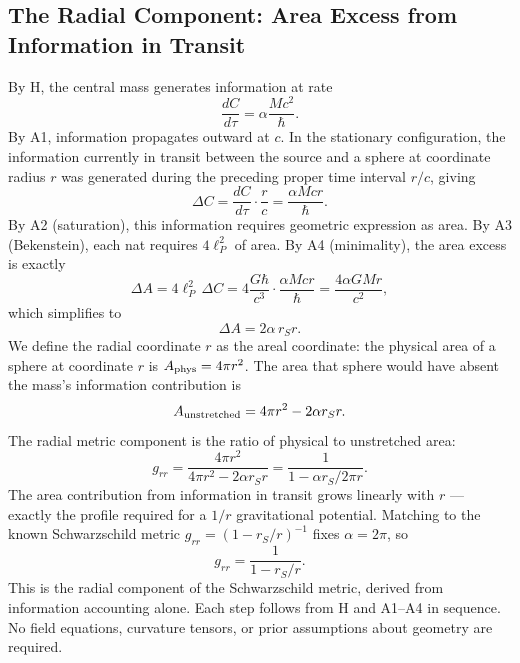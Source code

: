 \documentclass[12pt]{article}
\begin{document}
\subsection{The Radial Component: Area Excess from Information
in Transit}
\label{sec:grr}

By H, the central mass generates information at rate
\begin{equation}
  \frac{dC}{d\tau} = \alpha \frac{Mc^2}{\hbar}.
  \label{eq:gen-rate}
\end{equation}
By A1, information propagates outward at $c$.
In the stationary configuration, the information currently in transit
between the source and a sphere at coordinate radius $r$ was generated
during the preceding proper time interval $r/c$, giving
\begin{equation}
  \Delta C = \frac{dC}{d\tau}\cdot\frac{r}{c}
           = \frac{\alpha Mcr}{\hbar}.
  \label{eq:transit}
\end{equation}
By A2 (saturation), this information requires geometric expression as
area.
By A3 (Bekenstein), each nat requires $4\ell_P^2$ of area.
By A4 (minimality), the area excess is exactly
\begin{equation}
  \Delta A = 4\ell_P^2\,\Delta C
           = 4\frac{G\hbar}{c^3}\cdot\frac{\alpha Mcr}{\hbar}
           = \frac{4\alpha GMr}{c^2},
  \label{eq:deltaA}
\end{equation}
which simplifies to
\begin{equation}
  \Delta A = 2\alpha\, r_S r.
  \label{eq:deltaA-simple}
\end{equation}
We define the radial coordinate $r$ as the areal coordinate: the
physical area of a sphere at coordinate $r$ is $A_{\rm phys} = 4\pi r^2$.
The area that sphere would have absent the mass's information
contribution is
\begin{equation}
  A_{\rm unstretched} = 4\pi r^2 - 2\alpha r_S r.
  \label{eq:unstretched}
\end{equation}
The radial metric component is the ratio of physical to unstretched
area:
\begin{equation}
  g_{rr} = \frac{4\pi r^2}{4\pi r^2 - 2\alpha r_S r}
          = \frac{1}{1 - \alpha r_S/2\pi r}.
  \label{eq:grr-alpha}
\end{equation}
The area contribution from information in transit grows linearly with
$r$ --- exactly the profile required for a $1/r$ gravitational potential.
Matching to the known Schwarzschild metric $g_{rr} = (1 - r_S/r)^{-1}$
fixes $\alpha = 2\pi$, so
\begin{equation}
  g_{rr} = \frac{1}{1 - r_S/r}.
  \label{eq:grr}
\end{equation}
This is the radial component of the Schwarzschild metric, derived from
information accounting alone.
Each step follows from H and A1--A4 in sequence.
No field equations, curvature tensors, or prior assumptions about
geometry are required.
\end{document}
